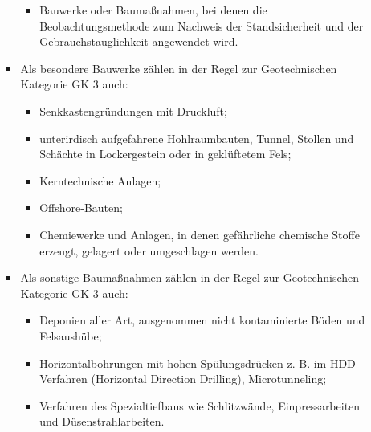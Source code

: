 \documentclass[fleqn,twoside]{article}
\begin{document}
\begin{itemize}
\begin{itemize}
\begin{itemize}
\begin{itemize}
                                \item Bauwerke oder Baumaßnahmen, bei denen die Beobachtungsmethode zum Nachweis der Standsicherheit und der Gebrauchstauglichkeit angewendet wird.
                            \end{itemize}
                        \item Als besondere Bauwerke zählen in der Regel zur Geotechnischen Kategorie GK 3 auch:
                            \begin{itemize}
                                \item Senkkastengründungen mit Druckluft;
                                \item unterirdisch aufgefahrene Hohlraumbauten, Tunnel, Stollen und Schächte in Lockergestein oder in                geklüftetem Fels;
                                \item Kerntechnische Anlagen;
                                \item Offshore-Bauten;
                                \item Chemiewerke und Anlagen, in denen gefährliche chemische Stoffe erzeugt, gelagert oder umgeschlagen                werden.
                            \end{itemize}
                        \item Als sonstige Baumaßnahmen zählen in der Regel zur Geotechnischen Kategorie GK 3 auch:
                            \begin{itemize}
                                \item Deponien aller Art, ausgenommen nicht kontaminierte Böden und Felsaushübe;
                                \item Horizontalbohrungen mit hohen Spülungsdrücken z. B. im HDD-Verfahren (Horizontal Direction                Drilling), Microtunneling;
                                \item Verfahren des Spezialtiefbaus wie Schlitzwände, Einpressarbeiten und Düsenstrahlarbeiten.
                            \end{itemize}
                    \end{itemize}
        \end{itemize}
    
\end{itemize}
\end{document}
